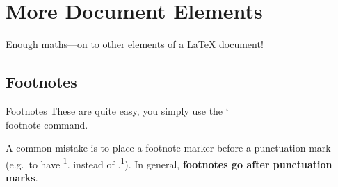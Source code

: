 \documentclass{beamer}
\begin{document}
    \section{More Document Elements}
    \begin{frame}
        \centering\LARGE
        Enough maths---on to other elements of a \LaTeX{} document!
    \end{frame}

    \subsection{Footnotes}
    \begin{frame}{Footnotes}
        These are quite easy, you simply use the {\ttfamily\color{red!60!black}\char`\\footnote} command. 
        \begin{center}
             \qquad 
            {}
        \end{center}
    
        \bigskip
    
        A common mistake is to place a footnote marker before a punctuation mark (e.g.\ to have \textsuperscript1. instead of .\textsuperscript1). In general, \textbf{footnotes go after punctuation marks}.
    \end{frame}
\end{document}

